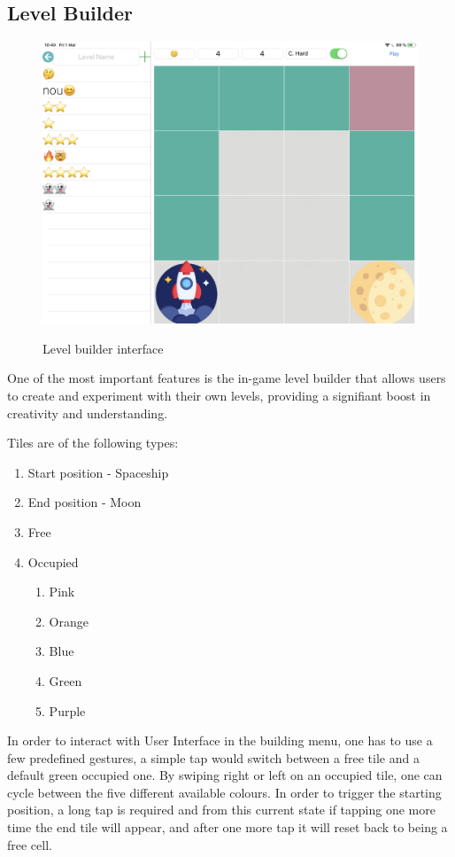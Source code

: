 \documentclass[12 pct]{report}
\begin{document}
\subsection*{Level Builder}
\begin{figure}[H]
\includegraphics[width=1.0\textwidth]{ArRobotCode3}
\centering
\label{fig:levelBuilder}
\caption{Level builder interface}
\end{figure}

One of the most important features is the in-game level builder that allows users to create and experiment with their own levels, providing a signifiant boost in creativity and understanding. 

Tiles are of the following types:
\begin{enumerate}
\item Start position - Spaceship
\item End position - Moon
\item Free
\item Occupied
\begin{enumerate}
\item Pink
\item Orange
\item Blue
\item Green
\item Purple
\end{enumerate}
\end{enumerate}

In order to interact with User Interface in the building menu, one has to use a few predefined gestures, a simple tap would switch between a free tile and a default green occupied one. By swiping right or left on an occupied tile, one can cycle between the five different available colours. In order to trigger the starting position, a long tap is required and from this current state if tapping one more time the end tile will appear, and after one more tap it will reset back to being a free cell.
\end{document}
